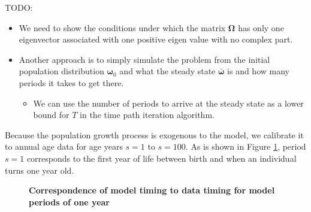 \documentclass[letterpaper,12pt]{article}
\theoremstyle{definition}
\begin{document}
  \noindent TODO:
  \begin{itemize}
    \item We need to show the conditions under which the matrix $\bm{\Omega}$ has only one eigenvector associated with one positive eigen value with no complex part.
    \item Another approach is to simply simulate the problem from the initial population distribution $\bm{\omega}_0$ and what the steady state $\bm{\bar{\omega}}$ is and how many periods it takes to get there.
      \begin{itemize}
        \item We can use the number of periods to arrive at the steady state as a lower bound for $T$ in the time path iteration algorithm.
      \end{itemize}
  \end{itemize}

  Because the population growth process is exogenous to the model, we calibrate it to annual age data for age years $s=1$ to $s=100$. As is shown in Figure \ref{FigPerTime}, period $s=1$ corresponds to the first year of life between birth and when an individual turns one year old.

  \begin{figure}[htbp]\centering \captionsetup{width=4.0in}
    \caption{\label{FigPerTime}\textbf{Correspondence of model timing to data timing for model periods of one year}}
  \end{figure}
\end{document}
